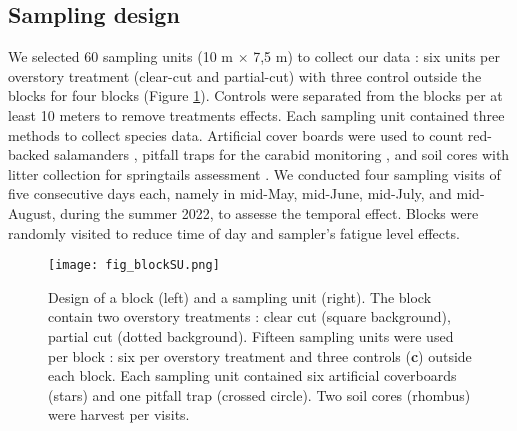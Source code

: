 \subsection*{Sampling design}
\label{subsec:sampling}


We selected 60 sampling units (10 m $\times$ 7,5 m) to collect our data : six units per overstory treatment (clear-cut and partial-cut) with three control outside the blocks for four blocks (Figure \ref*{fig:blockSU}).
Controls were separated from the blocks per at least 10 meters to remove treatments effects.
Each sampling unit contained three methods to collect species data. 
Artificial cover boards were used to count red-backed salamanders \citep{hesedUncoveringSalamanderEcology2012,mazerolleWoodlandSalamanderPopulation2021a,mooreComparisonPopulationEastern2009c}, 
pitfall traps for the carabid monitoring \citep{spenceSamplingCarabidAssemblages1994a}, and soil cores with litter collection for springtails assessment \citep{rousseauForestFloorMesofauna2018}.
We conducted four sampling visits of five consecutive days each, namely in mid-May, mid-June, mid-July, and mid-August, during the summer 2022, to assesse the temporal effect. 
Blocks were randomly visited to reduce time of day and sampler's fatigue level effects.


\begin{figure}[ht]
	\centering
	\texttt{[image: fig\_blockSU.png]}
	\caption[Design of one block and one sampling unit with three sampling methods.]{
  Design of a block (left) and a sampling unit (right). 
  The block contain two overstory treatments : clear cut (square background), partial cut (dotted background). 
  Fifteen sampling units were used per block : six per overstory treatment and three controls (\textbf{c}) outside each block.
  Each sampling unit contained six artificial coverboards (stars) and one pitfall trap (crossed circle). Two soil cores (rhombus) were harvest per visits.
  }
	\label{fig:blockSU}
	\end{figure}  

  \vspace{0.5cm}

